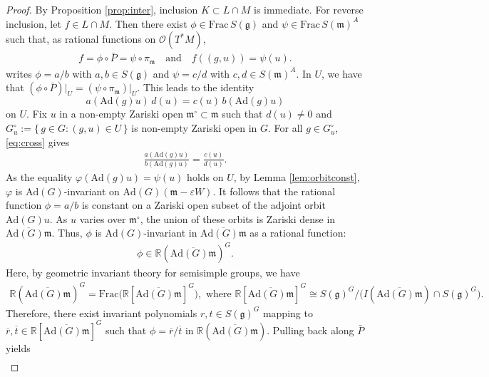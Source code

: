 \documentclass[11pt]{amsart}
\theoremstyle{definition}
\theoremstyle{plain}
\theoremstyle{conclusion}
\begin{document}
\begin{proof}
By Proposition \ref{prop:inter}, inclusion $K\subset L\cap M$ is immediate. For reverse inclusion, let $f\in L\cap M$. Then there exist $\phi\in \mathrm{Frac}\, S(\mathfrak{g})$ and $\psi\in \mathrm{Frac} \,S(\mathfrak{m})^A$ such that, as rational functions on $\mathcal{O}(T^*M)$, \begin{align*}
f=\phi\circ \bar{P} = \psi \circ \pi_\mathfrak{m} \quad\text{and}\quad f((g,u))=\psi(u).
\end{align*} writes $\phi=a/b$ with $a,b\in S(\mathfrak{g})$ and $\psi=c/d$ with $c,d\in S(\mathfrak{m})^A$. In $U$, we have that $\left(\phi \circ \bar{P}\right)\vert_U = \left( \psi \circ \pi_\mathfrak{m}\right)\vert_U$. This leads to the identity \begin{equation}
a(\mathrm{Ad}(g)u)\,d(u)= c(u)\,b(\mathrm{Ad}(g)u) \label{eq:cross}
\end{equation} on $U$. Fix $u$ in a non-empty Zariski open $\mathfrak{m}^\circ\subset\mathfrak{m}$ such that $d(u)\neq 0$ and $ G_u^\circ:=\{\,g\in G: (g,u)\in U\,\} $ is non-empty Zariski open in $G$. For all $g\in G_u^\circ$, \eqref{eq:cross} gives \begin{align*}
\frac{a(\mathrm{Ad}(g)u)}{b(\mathrm{Ad}(g)u)}=\frac{c(u)}{d(u)} .
\end{align*}  As the equality $\varphi(\mathrm{Ad}(g)u) = \psi(u)$ holds on $U$, by Lemma \ref{lem:orbitconst}, $\varphi$ is $\mathrm{Ad}(G)$-invariant on $\mathrm{Ad}(G) (\mathfrak{m}-\varepsilon W)$. It follows that the rational function $\phi=a/b$ is constant on a Zariski open subset of the adjoint orbit $\mathrm{Ad}(G)u$. As $u$ varies over $\mathfrak{m}^\circ$, the union of these orbits is Zariski dense in $\overline{\mathrm{Ad}(G)\mathfrak{m}}$. Thus, $\phi$ is $\mathrm{Ad}(G)$-invariant in $\overline{\mathrm{Ad}(G)\mathfrak{m}}$ as a rational function: \begin{align*}
\phi\in \mathbb{R}(\overline{\mathrm{Ad}(G)\mathfrak{m}})^G.
\end{align*} Here, by geometric invariant theory for semisimple groups, we have \begin{align*}
\mathbb{R}(\overline{\mathrm{Ad}(G)\mathfrak{m}})^G = \mathrm{Frac}\big(\mathbb{R}[\overline{\mathrm{Ad}(G)\mathfrak{m}}]^G\big),  \text{ where }  \mathbb{R}[\overline{\mathrm{Ad}(G)\mathfrak{m}}]^G\cong S(\mathfrak{g})^G\big/\big(I(\overline{\mathrm{Ad}(G)\mathfrak{m}}) \cap S(\mathfrak{g})^G\big).
\end{align*} Therefore, there exist invariant polynomials $r,t \in S(\mathfrak{g})^G$ mapping to $\overline r,\overline{t}\in \mathbb{R}[\overline{\mathrm{Ad}(G)\mathfrak{m}}]^G$ such that $\phi=\overline r/\overline{t}$ in $\mathbb{R}(\overline{\mathrm{Ad}(G)\mathfrak{m}})$. Pulling back along $\bar{P}$ yields \begin{align*}

\end{align*}
\end{proof}
\end{document}
